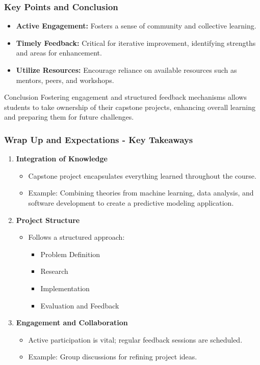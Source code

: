 \documentclass[aspectratio=169]{beamer}
\begin{document}
\begin{frame}[fragile]
    \frametitle{Key Points and Conclusion}
    \begin{itemize}
        \item \textbf{Active Engagement:} Fosters a sense of community and collective learning.
        \item \textbf{Timely Feedback:} Critical for iterative improvement, identifying strengths and areas for enhancement.
        \item \textbf{Utilize Resources:} Encourage reliance on available resources such as mentors, peers, and workshops.
    \end{itemize}
    \begin{block}{Conclusion}
        Fostering engagement and structured feedback mechanisms allows students to take ownership of their capstone projects, enhancing overall learning and preparing them for future challenges.
    \end{block}
\end{frame}

\begin{frame}[fragile]
    \frametitle{Wrap Up and Expectations - Key Takeaways}
    \begin{enumerate}
        \item \textbf{Integration of Knowledge}
        \begin{itemize}
            \item Capstone project encapsulates everything learned throughout the course.
            \item Example: Combining theories from machine learning, data analysis, and software development to create a predictive modeling application.
        \end{itemize}
        
        \item \textbf{Project Structure}
        \begin{itemize}
            \item Follows a structured approach: 
            \begin{itemize}
                \item Problem Definition
                \item Research
                \item Implementation
                \item Evaluation and Feedback
            \end{itemize}
        \end{itemize}

        \item \textbf{Engagement and Collaboration}
        \begin{itemize}
            \item Active participation is vital; regular feedback sessions are scheduled.
            \item Example: Group discussions for refining project ideas.
        \end{itemize}
    \end{enumerate}
\end{frame}
\end{document}
